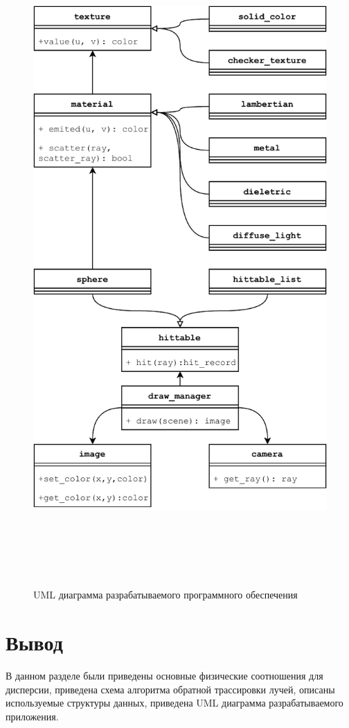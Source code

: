         \begin{figure}
            \centering
            \includegraphics[width=\textwidth,height=25cm,keepaspectratio]{inc/img/uml.pdf}
            \caption{UML диаграмма разрабатываемого программного обеспечения}
            \label{fig:uml}
        \end{figure}

\clearpage

    \section{Вывод}

        В данном разделе были приведены основные физические соотношения для дисперсии, приведена схема алгоритма обратной трассировки лучей, описаны используемые структуры данных, приведена UML диаграмма разрабатываемого приложения.